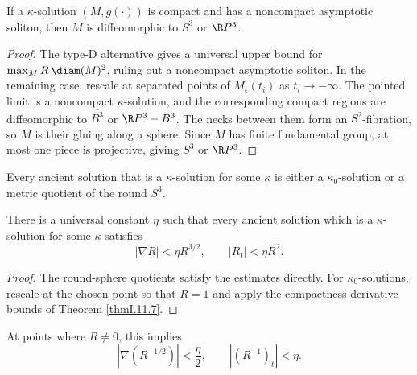 \begin{lemma}
  \label{lem:kl-three-dimensional-solutions-compactness-kappa-solutions}
 \label{S3RP3}
If a $\kappa$-solution $(M,g(\cdot))$ is compact and has a noncompact
asymptotic soliton, then $M$ is diffeomorphic to $S^3$ or $\R P^3$.
\end{lemma}
\begin{proof}
\sketch The type-D alternative gives a universal upper bound for
$\max_M R\,\diam(M)^2$, ruling out a noncompact asymptotic soliton. In the
remaining case, rescale at separated points of $M_\epsilon(t_i)$ as
$t_i\to-\infty$. The pointed limit is a noncompact $\kappa$-solution, and the
corresponding compact regions are diffeomorphic to $\overline{B^3}$ or
$\R P^3-B^3$. The necks between them form an $S^2$-fibration, so $M$ is their
gluing along a sphere. Since $M$ has finite fundamental group, at most one
piece is projective, giving $S^3$ or $\R P^3$.
\end{proof}

Every ancient solution that is a $\kappa$-solution for some $\kappa$ is either
a $\kappa_0$-solution or a metric quotient of the round $S^3$.

\begin{lemma}
  \label{lem:kl-three-dimensional-solutions-existence-kappa-solutions-4}
 \label{derivativeestimates}
There is a universal constant $\eta$ such that every ancient solution which is
a $\kappa$-solution for some $\kappa$ satisfies
\begin{equation} \label{derestimates}
|\nabla R|<\eta R^{3/2},\qquad |R_t|<\eta R^2.
\end{equation}
\end{lemma}
\begin{proof}
\sketch The round-sphere quotients satisfy the estimates directly. For
$\kappa_0$-solutions, rescale at the chosen point so that $R=1$ and apply the
compactness derivative bounds of Theorem \ref{thmI.11.7}.
\end{proof}

At points where $R\ne0$, this implies
\begin{equation}
\label{eqnderestimatesrinverse}
|\nabla(R^{-1/2})|<\frac\eta2,\qquad |(R^{-1})_t|<\eta.
\end{equation}

